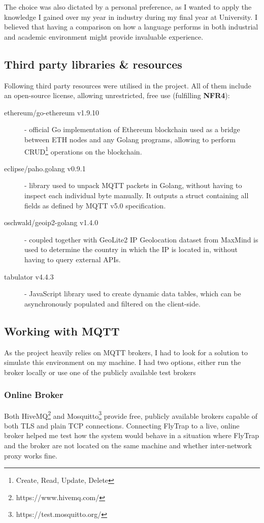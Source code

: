 The choice was also dictated by a personal preference, as I wanted to apply the knowledge I gained over my year in industry during my final year at University. I believed that having a comparison on how a language performs in both industrial and academic environment might provide invaluable experience.
\subsection{Third party libraries \& resources}\label{sec:tpp}
Following third party resources were utilised in the project. All of them include an open-source license, allowing unrestricted, free use (fulfilling \textbf{NFR4}):
\begin{description}
  \item[ethereum/go-ethereum v1.9.10] \cite{ethereum2017official} - official Go implementation of Ethereum blockchain used as a bridge between ETH nodes and any Golang programs, allowing to perform CRUD\footnote{Create, Read, Update, Delete} operations on the blockchain.
    \item[eclipse/paho.golang v0.9.1] \cite{pahogolang} - library used to unpack MQTT packets in Golang, without having to inspect each individual byte manually. It outputs a struct containing all fields as defined by MQTT v5.0 specification.
    \item[oschwald/geoip2-golang v1.4.0] \cite{geoip2} - coupled together with GeoLite2 IP Geolocation dataset from MaxMind \cite{maxmind} is used to determine the country in which the IP is located in, without having to query external APIs. 
    \item[tabulator v4.4.3] \cite{tabulator} - JavaScript library used to create dynamic data tables, which can be asynchronously populated and filtered on the client-side.
\end{description}

\subsection{Working with MQTT}
As the project heavily relies on MQTT brokers, I had to look for a solution to simulate this environment on my machine. I had two  options, either run the broker locally or use one of the publicly available test brokers
\subsubsection{Online Broker}
Both HiveMQ\footnote{https://www.hivemq.com/} and Mosquitto\footnote{https://test.mosquitto.org/} provide free, publicly available brokers capable of both TLS and plain TCP connections. Connecting FlyTrap to a live, online broker helped me test how the system would behave in a situation where FlyTrap and the broker are not located on the same machine and whether inter-network proxy works fine.
